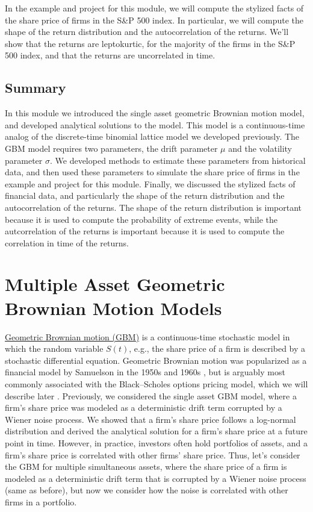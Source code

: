 \documentclass[11pt]{article}
\theoremstyle{definition}
\begin{document}
In the example and project for this module, we will compute the stylized facts of the share price of firms in the S\&P 500 index.
In particular, we will compute the shape of the return distribution and the autocorrelation of the returns. 
We'll show that the returns are leptokurtic, for the majority of the firms in the S\&P 500 index, and that the returns are uncorrelated in time.

\subsection{Summary}
In this module we introduced the single asset geometric Brownian motion model, and developed analytical solutions to the model.
This model is a continuous-time analog of the discrete-time binomial lattice model we developed previously.
The GBM model requires two parameters, the drift parameter $\mu$ and the volatility parameter $\sigma$. 
We developed methods to estimate these parameters from historical data, 
and then used these parameters to simulate the share price of firms in the example and project for this module.
Finally, we discussed the stylized facts of financial data, and particularly the shape of the return distribution and the autocorrelation of the returns.
The shape of the return distribution is important because it is used to compute the probability of extreme events, 
while the autcorrelation of the returns is important because it is used to compute the correlation in time of the returns. 

\section{Multiple Asset Geometric Brownian Motion Models}
\href{https://en.wikipedia.org/wiki/Geometric_Brownian_motion}{Geometric Brownian motion (GBM)} is a continuous-time stochastic model in which the random variable $S(t)$, 
e.g., the share price of a firm is described by a stochastic differential equation.
Geometric Brownian motion was popularized as a financial model by Samuelson in the 1950s and 1960s \cite{Merton2006}, 
but is arguably most commonly associated with the Black–Scholes options pricing model, which we will describe later 
\cite{BlackScholes1973}. Previously, we considered the single asset GBM model, 
where a firm's share price was modeled as a deterministic drift term corrupted by a Wiener noise process. 
We showed that a firm's share price follows a log-normal distribution and derived the analytical solution for a firm's share price at a future point in time.
However, in practice, investors often hold portfolios of assets, and a firm's share price is correlated with other firms' share price.
Thus, let's consider the GBM for multiple simultaneous assets, where the share price of a firm is modeled as a deterministic drift term 
that is corrupted by a Wiener noise process (same as before), but now we consider how the noise is correlated with other firms in a portfolio.
\end{document}
